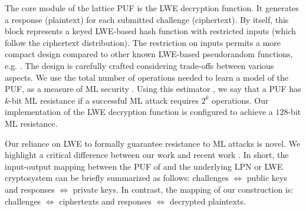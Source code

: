The core module of the lattice PUF is the LWE decryption function. It generates a response (plaintext) for each submitted challenge (ciphertext). By itself, this block represents a keyed LWE-based hash function with restricted inputs (which follow the ciphertext distribution). The restriction on inputs permits a more compact design compared to other known LWE-based pseudorandom functions, e.g. \cite{brenner2014fpga}. 
The design is carefully crafted considering trade-offs between various aspects.
We use the total number of operations needed to learn a model of the PUF, as a measure of ML security \cite{lindner2011better, micciancio2009lattice, albrecht2015concrete}. %
Using this estimator \cite{albrecht2015concrete}, we say that a PUF has $k$-bit ML resistance if a successful ML attack requires $2^k$ operations. 
Our implementation of the LWE decryption function is configured to achieve a $128$-bit ML resistance.

Our reliance on LWE to formally guarantee resistance to ML attacks is novel. 
We highlight a critical difference between our work and recent work  \cite{herder2017trapdoor,jin2017fpga}.
In short, the input-output mapping between the PUF of \cite{herder2017trapdoor,jin2017fpga} and the underlying LPN or LWE cryptosystem can be briefly summarized as follows: 
 challenges $\Longleftrightarrow$ public keys and responses $\Longleftrightarrow$  private keys. In contrast, the mapping of our construction is: challenges $\Longleftrightarrow$ ciphertexts and responses $\Longleftrightarrow$ decrypted plaintexts.

